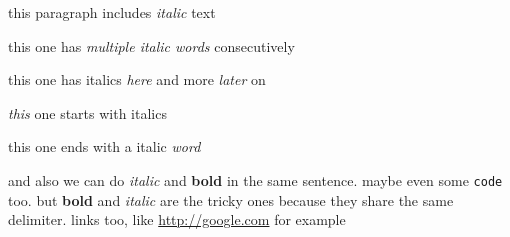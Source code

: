 

this paragraph includes \emph{italic}  text

this one has \emph{multiple italic words}  consecutively

this one has italics \emph{here} and more \emph{later}  on

\emph{this} one starts with italics

this one ends with a italic \emph{word}

and also we can do \emph{italic} and \textbf{bold} in the same sentence. maybe even some \verb|code| too. but \textbf{bold} and \emph{italic} are the tricky ones because they share the same delimiter. links too, like \url{http://google.com} for example